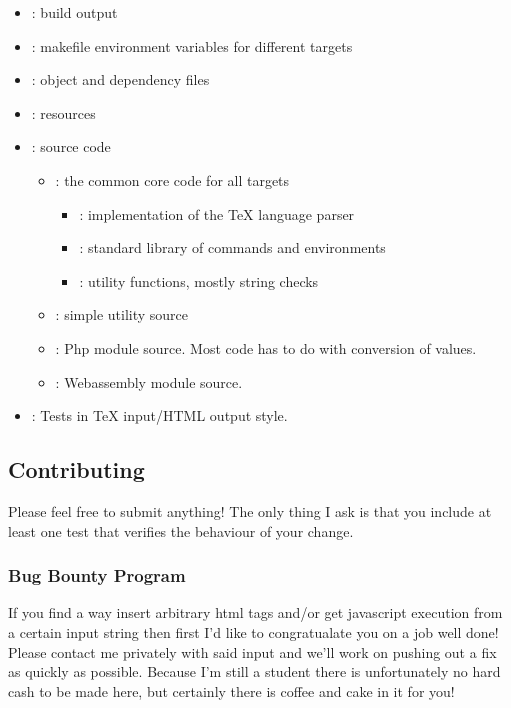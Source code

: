 \begin{page}
\begin{itemize}
\item {}: build output
\item {}: makefile environment variables for different targets
\item {}: object and dependency files
\item {}: resources
\item {}: source code
\begin{itemize}
  \item {}: the common core code for all targets
  \begin{itemize}
    \item {}: implementation of the TeX language parser
    \item {}: standard library of commands and environments
    \item {}: utility functions, mostly string checks
  \end{itemize}
  \item {}: simple utility source
  \item {}: Php module source. Most code has to do with conversion of values.
  \item {}: Webassembly module source.
\end{itemize}
\item {}: Tests in TeX input/HTML output style.
\end{itemize}

\subsection{Contributing}

Please feel free to submit anything! The only thing I ask is that you include at least one test that verifies the behaviour of your change.

\subsubsection{Bug Bounty Program}

If you find a way insert arbitrary html tags and/or get javascript execution from a certain input string then first I'd like to congratualate you on a job well done! Please contact me privately with said input and we'll work on pushing out a fix as quickly as possible. Because I'm still a student there is unfortunately no hard cash to be made here, but certainly there is coffee and cake in it for you!


\end{page}
